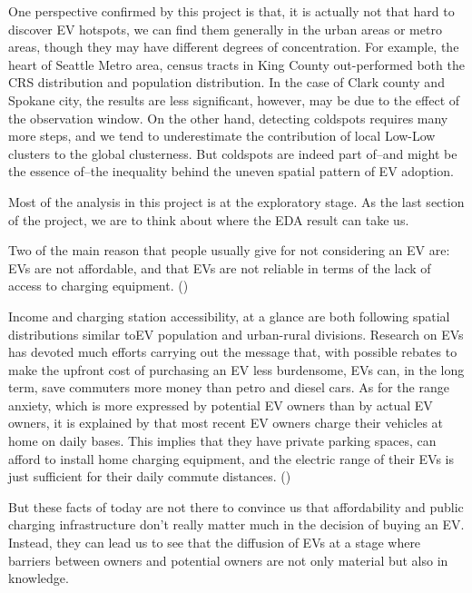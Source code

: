 \documentclass[
  letterpaper,
  DIV=11,
  numbers=noendperiod]{scrartcl}
\begin{document}
One perspective confirmed by this project is that, it is actually not
that hard to discover EV hotspots, we can find them generally in the
urban areas or metro areas, though they may have different degrees of
concentration. For example, the heart of Seattle Metro area, census
tracts in King County out-performed both the CRS distribution and
population distribution. In the case of Clark county and Spokane city,
the results are less significant, however, may be due to the effect of
the observation window. On the other hand, detecting coldspots requires
many more steps, and we tend to underestimate the contribution of local
Low-Low clusters to the global clusterness. But coldspots are indeed
part of--and might be the essence of--the inequality behind the uneven
spatial pattern of EV adoption.

Most of the analysis in this project is at the exploratory stage. As the
last section of the project, we are to think about where the EDA result
can take us.

Two of the main reason that people usually give for not considering an
EV are: EVs are not affordable, and that EVs are not reliable in terms
of the lack of access to charging equipment.
()

Income and charging station accessibility, at a glance are both
following spatial distributions similar toEV population and urban-rural
divisions. Research on EVs has devoted much efforts carrying out the
message that, with possible rebates to make the upfront cost of
purchasing an EV less burdensome, EVs can, in the long term, save
commuters more money than petro and diesel cars. As for the range
anxiety, which is more expressed by potential EV owners than by actual
EV owners, it is explained by that most recent EV owners charge their
vehicles at home on daily bases. This implies that they have private
parking spaces, can afford to install home charging equipment, and the
electric range of their EVs is just sufficient for their daily commute
distances. ()

But these facts of today are not there to convince us that affordability
and public charging infrastructure don't really matter much in the
decision of buying an EV. Instead, they can lead us to see that the
diffusion of EVs at a stage where barriers between owners and potential
owners are not only material but also in knowledge.
\end{document}
